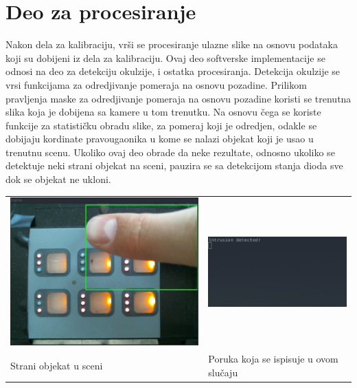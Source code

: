 \documentclass[a4paper,12pt, projekat]{etf}
\begin{document}
        \section{Deo za procesiranje}
        Nakon dela za kalibraciju, vr\v{s}i se procesiranje ulazne slike na osnovu
        podataka koji su dobijeni iz dela za kalibraciju. Ovaj deo softverske
        implementacije se odnosi na deo za detekciju okulzije, i ostatka
        procesiranja. Detekcija okulzije se vrsi funkcijama za odredjivanje
        pomeraja na osnovu pozadine. Prilikom pravljenja maske za odredjivanje
        pomeraja na osnovu pozadine koristi se trenutna slika koja je dobijena
        sa kamere u tom trenutku. Na osnovu \v{c}ega se koriste funkcije za
        statisti\v{c}ku obradu slike, za pomeraj koji je odredjen, odakle se
        dobijaju kordinate pravougaonika u kome se nalazi objekat koji je usao
        u trenutnu scenu. Ukoliko ovaj deo obrade da neke rezultate, odnosno
        ukoliko se detektuje neki strani objekat na sceni, pauzira se sa
        detekcijom stanja dioda sve dok se objekat ne ukloni.

        \begin{table}[h!]
            \begin{tabular}{ll}
                \includegraphics[scale=0.3]{intrusionFirst.png} &
                \includegraphics[scale=0.4]{intrusionMsg.png} \\
                Strani objekat u sceni &
                Poruka koja se ispisuje u ovom slu\v{c}aju
            \end{tabular}
        \end{table}
\end{document}
